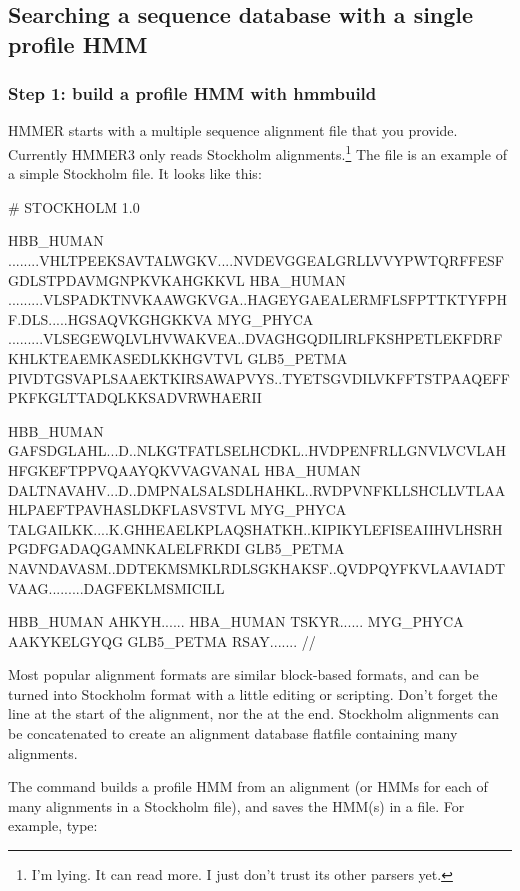 \subsection{Searching a sequence database with a single profile HMM}

\subsubsection{Step 1: build a profile HMM with hmmbuild}

HMMER starts with a multiple sequence alignment file that you
provide. Currently HMMER3 only reads Stockholm
alignments.\footnote{I'm lying. It can read more. I just don't trust
its other parsers yet.} The file  is an
example of a simple Stockholm file. It looks like this:

\begin{sreoutput}
# STOCKHOLM 1.0

HBB_HUMAN   ........VHLTPEEKSAVTALWGKV....NVDEVGGEALGRLLVVYPWTQRFFESFGDLSTPDAVMGNPKVKAHGKKVL
HBA_HUMAN   .........VLSPADKTNVKAAWGKVGA..HAGEYGAEALERMFLSFPTTKTYFPHF.DLS.....HGSAQVKGHGKKVA
MYG_PHYCA   .........VLSEGEWQLVLHVWAKVEA..DVAGHGQDILIRLFKSHPETLEKFDRFKHLKTEAEMKASEDLKKHGVTVL
GLB5_PETMA  PIVDTGSVAPLSAAEKTKIRSAWAPVYS..TYETSGVDILVKFFTSTPAAQEFFPKFKGLTTADQLKKSADVRWHAERII

HBB_HUMAN   GAFSDGLAHL...D..NLKGTFATLSELHCDKL..HVDPENFRLLGNVLVCVLAHHFGKEFTPPVQAAYQKVVAGVANAL
HBA_HUMAN   DALTNAVAHV...D..DMPNALSALSDLHAHKL..RVDPVNFKLLSHCLLVTLAAHLPAEFTPAVHASLDKFLASVSTVL
MYG_PHYCA   TALGAILKK....K.GHHEAELKPLAQSHATKH..KIPIKYLEFISEAIIHVLHSRHPGDFGADAQGAMNKALELFRKDI
GLB5_PETMA  NAVNDAVASM..DDTEKMSMKLRDLSGKHAKSF..QVDPQYFKVLAAVIADTVAAG.........DAGFEKLMSMICILL

HBB_HUMAN   AHKYH......
HBA_HUMAN   TSKYR......
MYG_PHYCA   AAKYKELGYQG
GLB5_PETMA  RSAY.......
//
\end{sreoutput}


Most popular alignment formats are similar block-based formats, and
can be turned into Stockholm format with a little editing or
scripting. Don't forget the  line at the start
of the alignment, nor the \prog{//} at the end. Stockholm alignments
can be concatenated to create an alignment database flatfile
containing many alignments.


The  command builds a profile HMM from an alignment (or
HMMs for each of many alignments in a Stockholm file), and saves the
HMM(s) in a file. For example, type:

